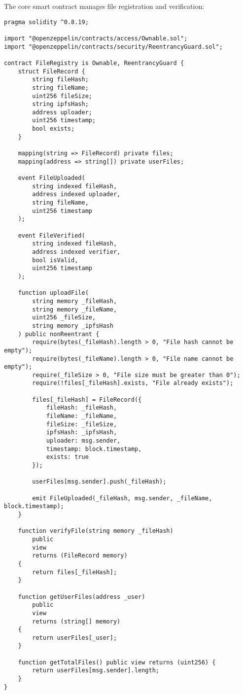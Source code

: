 \documentclass[11pt,a4paper]{article}
\begin{document}
The core smart contract manages file registration and verification:

\begin{lstlisting}[style=solidity, caption=FileRegistry Smart Contract]
pragma solidity ^0.8.19;

import "@openzeppelin/contracts/access/Ownable.sol";
import "@openzeppelin/contracts/security/ReentrancyGuard.sol";

contract FileRegistry is Ownable, ReentrancyGuard {
    struct FileRecord {
        string fileHash;
        string fileName;
        uint256 fileSize;
        string ipfsHash;
        address uploader;
        uint256 timestamp;
        bool exists;
    }
    
    mapping(string => FileRecord) private files;
    mapping(address => string[]) private userFiles;
    
    event FileUploaded(
        string indexed fileHash,
        address indexed uploader,
        string fileName,
        uint256 timestamp
    );
    
    event FileVerified(
        string indexed fileHash,
        address indexed verifier,
        bool isValid,
        uint256 timestamp
    );
    
    function uploadFile(
        string memory _fileHash,
        string memory _fileName,
        uint256 _fileSize,
        string memory _ipfsHash
    ) public nonReentrant {
        require(bytes(_fileHash).length > 0, "File hash cannot be empty");
        require(bytes(_fileName).length > 0, "File name cannot be empty");
        require(_fileSize > 0, "File size must be greater than 0");
        require(!files[_fileHash].exists, "File already exists");
        
        files[_fileHash] = FileRecord({
            fileHash: _fileHash,
            fileName: _fileName,
            fileSize: _fileSize,
            ipfsHash: _ipfsHash,
            uploader: msg.sender,
            timestamp: block.timestamp,
            exists: true
        });
        
        userFiles[msg.sender].push(_fileHash);
        
        emit FileUploaded(_fileHash, msg.sender, _fileName, block.timestamp);
    }
    
    function verifyFile(string memory _fileHash) 
        public 
        view 
        returns (FileRecord memory) 
    {
        return files[_fileHash];
    }
    
    function getUserFiles(address _user) 
        public 
        view 
        returns (string[] memory) 
    {
        return userFiles[_user];
    }
    
    function getTotalFiles() public view returns (uint256) {
        return userFiles[msg.sender].length;
    }
}
\end{lstlisting}
\end{document}
